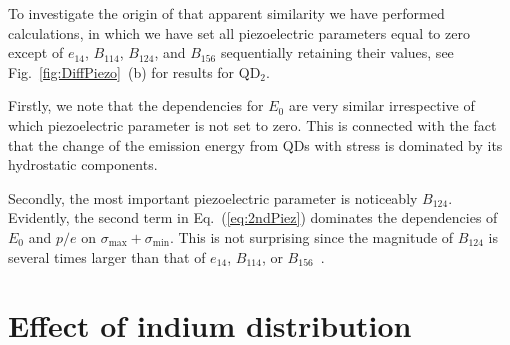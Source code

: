 %



To investigate the origin of that apparent similarity we have performed calculations, in which we have set all piezoelectric parameters equal to zero except of $e_{14}$, $B_{114}$, $B_{124}$, and $B_{156}$ sequentially retaining their values, see Fig.~\ref{fig:DiffPiezo}~(b) for results for QD$_2$. 


Firstly, we note that the dependencies for $E_0$ are very similar irrespective of which piezoelectric parameter is not set to zero. This is connected with the fact that the change of the emission energy from QDs with stress is dominated by its hydrostatic components.

Secondly, the most important piezoelectric parameter is noticeably $B_{124}$. Evidently, the second term in Eq.~(\ref{eq:2ndPiez}) dominates the dependencies of $E_0$ and $p/e$ on $\sigma_{\mathrm{max}}+\sigma_{\mathrm{min}}$. This is not surprising since the magnitude of $B_{124}$ is several times larger than that of $e_{14}$, $B_{114}$, or $B_{156}$~\cite{Beya-Wakata2011}. 


\section{Effect of indium distribution}

